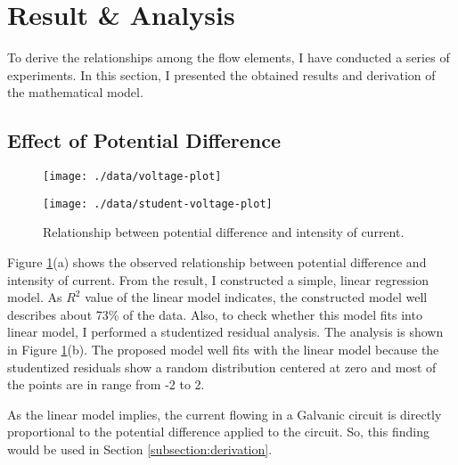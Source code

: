 
\section{Result \& Analysis}

To derive the relationships among the flow elements, I have conducted a series of experiments.
In this section, I presented the obtained results and derivation of the mathematical model.

\subsection{Effect of Potential Difference}

\begin{figure}[!t]
  \centering
  \begin{subfloat}[][Potential difference-current data and linear regression model: $y = 1.3677x + 0.3404, R^2 = 0.731$. $y$ denotes current, $x$ denotes relative potential difference.]
    {
      \texttt{[image: ./data/voltage-plot]}
    }
  \end{subfloat}

  \hfill

  \begin{subfloat}
    {
      \texttt{[image: ./data/student-voltage-plot]}
    }
  \end{subfloat}

  \caption{Relationship between potential difference and intensity of current.}
  \label{plot:voltage-current}
\end{figure}

Figure \ref{plot:voltage-current}(a) shows the observed relationship between potential difference and intensity of current.
From the result, I constructed a simple, linear regression model.
As $R^2$ value of the linear model indicates, the constructed model well describes about 73\% of the data.
Also, to check whether this model fits into linear model, I performed a studentized residual analysis.
The analysis is shown in Figure \ref{plot:voltage-current}(b).
The proposed model well fits with the linear model because the studentized residuals show a random distribution centered at zero and most of the points are in range from -2 to 2.

As the linear model implies, the current flowing in a Galvanic circuit is directly proportional to the potential difference applied to the circuit.
So, this finding would be used in Section \ref{subsection:derivation}.


